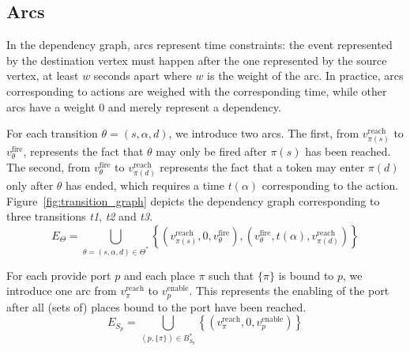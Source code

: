 \subsection{Arcs}

In the dependency graph, arcs represent time constraints: the event represented
by the destination vertex must happen after the one represented by the source
vertex, at least $w$ seconds apart where $w$ is the weight of the arc. In
practice, arcs corresponding to actions are weighed with the corresponding
time, while other arcs have a weight 0 and merely represent a dependency.


%

For each transition $\theta = (s, \alpha, d)$, we introduce
two arcs.
%
The first, from $v_{\pi(s)}^\text{reach}$
to $v_\theta^\text{fire}$, represents the fact that $\theta$ may only
be fired after $\pi(s)$ has been reached.
%
The second, from $v_\theta^\text{fire}$ to $v_{\pi(d)}^\text{reach}$
represents the fact that a token may enter $\pi(d)$ only after
$\theta$ has ended, which requires a time $t(\alpha)$ corresponding
to the action.
%
Figure~\ref{fig:transition_graph} depicts the dependency graph corresponding to three
transitions \emph{t1}, \emph{t2} and \emph{t3}.
\[
  E_\Theta = \bigcup_{\theta=(s,\alpha,d)\in\Theta^*} \left\{ \left(v_{\pi(s)}^\text{reach},0,v_\theta^\text{fire}\right), \left(v_\theta^\text{fire},t(\alpha),v_{\pi(d)}^\text{reach}\right)\right\} 
\]




For each provide port $p$ and each place $\pi$ such that
$\{\pi\}$ is bound to $p$, we introduce one arc from
$v_\pi^\text{reach}$ to $v_p^\text{enable}$. This represents the
enabling of the port after all (sets of) places bound to the port
have been reached.
\[
E_{S_p}= \bigcup_{(p,\{\pi\})\in B_{S_p}^*}\left\{ \left(v_\pi^\text{reach},0,v_p^\text{enable}\right)\right\}
\]

